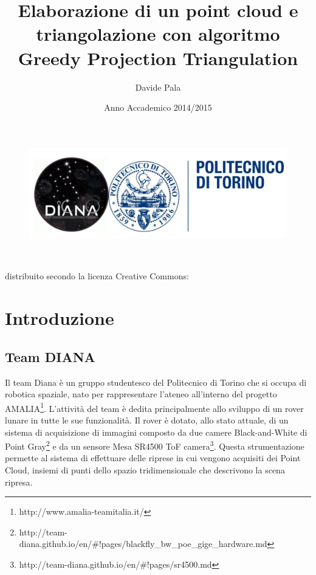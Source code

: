 \documentclass[a4paper,12pt]{article}
\title{Elaborazione di un point cloud e triangolazione con algoritmo Greedy Projection Triangulation}
\author{Davide Pala}
\date{Anno Accademico 2014/2015}
\begin{document}
\maketitle
\begin{figure}[H]
\centering
\includegraphics[width=13cm]{pics/logo_diana.jpg}
\end{figure}
\
\
\
\begin{center}
\small{distribuito secondo la licenza Creative Commons: \ccbyncsa}
\end{center}

\clearpage
\tableofcontents
\clearpage
\section{Introduzione}
	\subsection{Team DIANA}
	Il team Diana è un gruppo studentesco del Politecnico di Torino che si occupa di
	robotica spaziale, nato per rappresentare l'ateneo all'interno del progetto 
	AMALIA\footnote{http://www.amalia-teamitalia.it/}. 
	L'attività del team è dedita principalmente allo sviluppo di un rover lunare 
	in tutte le sue funzionalità. 
	Il rover è dotato, allo stato attuale, di un sistema di acquisizione di immagini 
	composto da due camere Black-and-White di Point 
	Gray\footnote{http://team-diana.github.io/en/\#!pages/blackfly\_bw\_poe\_gige\_hardware.md} 
	e da un sensore Mesa SR4500 ToF	camera\footnote{http://team-diana.github.io/en/\#!pages/sr4500.md}.
	Questa strumentazione permette al sistema di effettuare delle riprese in cui vengono acquisiti dei 
	Point Cloud, insiemi di punti dello spazio tridimensionale che descrivono la scena ripresa.
	
\end{document}
